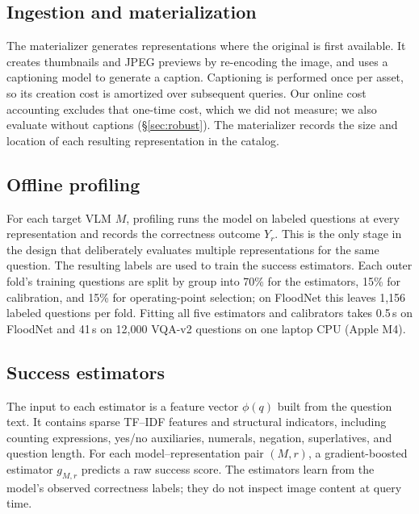 \subsection{Ingestion and materialization}

The materializer generates representations where the original is first
available. It creates thumbnails and JPEG previews by re-encoding the image,
and uses a captioning model to generate a caption. Captioning is performed
once per asset, so its creation cost is amortized over subsequent queries.
Our online cost accounting excludes that one-time cost, which we did not
measure; we also evaluate \system without captions (\S\ref{sec:robust}). The materializer records the
size and location of each resulting representation in the catalog.

\subsection{Offline profiling}

For each target VLM $M$, profiling runs the model on labeled questions at
every representation and records the correctness outcome $Y_r$. This is the
only stage in the design that deliberately evaluates multiple representations
for the same question. The resulting labels are used to train the success
estimators. Each outer fold's training questions are split by group into 70\%
for the estimators, 15\% for calibration, and 15\% for operating-point
selection; on FloodNet this leaves 1,156 labeled questions per fold. Fitting
all five estimators and calibrators takes 0.5\,s on FloodNet and 41\,s on
12,000 VQA-v2 questions on one laptop CPU (Apple M4).

\subsection{Success estimators}

The input to each estimator is a feature vector $\phi(q)$ built from the
question text. It contains sparse TF--IDF features and structural indicators,
including counting expressions, yes/no auxiliaries, numerals, negation,
superlatives, and question length. For each model--representation pair
$(M,r)$, a gradient-boosted estimator $g_{M,r}$ predicts a raw success score.
The estimators learn from the model's observed correctness labels; they do not
inspect image content at query time.

